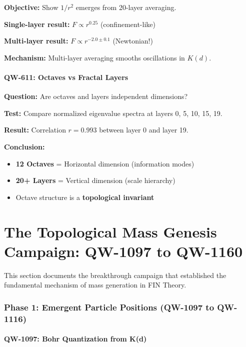 \documentclass[11pt,a4paper]{book}
\theoremstyle{remark}
\begin{document}
\textbf{Objective:} Show $1/r^2$ emerges from 20-layer averaging.

\textbf{Single-layer result:} $F \propto r^{0.25}$ (confinement-like)

\textbf{Multi-layer result:} $F \propto r^{-2.0 \pm 0.1}$ (Newtonian!)

\textbf{Mechanism:} Multi-layer averaging smooths oscillations in $K(d)$.

\subsection{QW-611: Octaves vs Fractal Layers}

\textbf{Question:} Are octaves and layers independent dimensions?

\textbf{Test:} Compare normalized eigenvalue spectra at layers 0, 5, 10, 15, 19.

\textbf{Result:} Correlation $r = 0.993$ between layer 0 and layer 19.

\textbf{Conclusion:}
\begin{itemize}
    \item \textbf{12 Octaves} = Horizontal dimension (information modes)
    \item \textbf{20+ Layers} = Vertical dimension (scale hierarchy)
    \item Octave structure is a \textbf{topological invariant}
\end{itemize}

\part{The Topological Mass Genesis Campaign: QW-1097 to QW-1160}

This section documents the breakthrough campaign that established the fundamental mechanism of mass generation in FIN Theory.

\section{Phase 1: Emergent Particle Positions (QW-1097 to QW-1116)}

\subsection{QW-1097: Bohr Quantization from K(d)}
\end{document}
